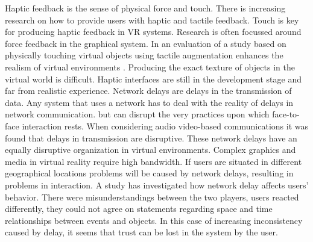 Haptic feedback is the sense of physical force and touch. There is increasing research on how to provide users with haptic and tactile feedback. Touch is key for producing haptic feedback in VR systems. Research is often focussed around force feedback in the graphical system. In an evaluation of a study based on physically touching virtual objects using tactile augmentation enhances the realism of virtual environments \cite{hoffman1998physically}. Producing the exact texture of objects in the virtual world is difficult. Haptic interfaces are still in the development stage and far from realistic experience. 
Network delays are delays in the transmission of data. Any system that uses a network has to deal with the reality of delays in network communication. but can disrupt the very practices upon which face-to-face interaction rests. When considering audio video-based communications it was found that delays in transmission are disruptive\cite{ruhleder1999meaning}. These network delays have an equally disruptive organization in virtual environments. Complex graphics and media in virtual reality require high bandwidth. If users are situated in different geographical locations problems will be caused by network delays, resulting in problems in interaction. A study \cite{vaghi1999coping} has investigated how network delay affects users’ behavior. There were misunderstandings between the two players, users reacted differently, they could not agree on statements regarding space and time relationships between events and objects. In this case of increasing inconsistency caused by delay, it seems that trust can be lost in the system by the user.



